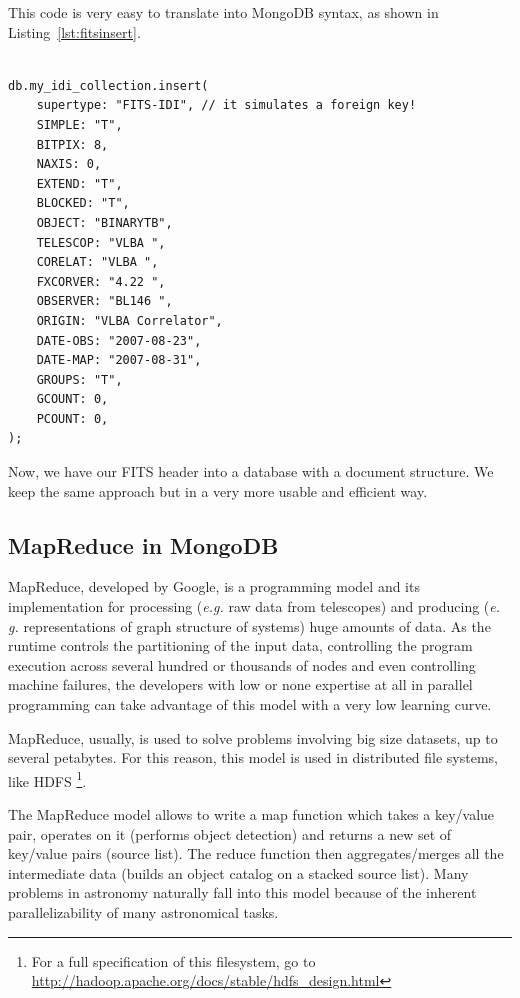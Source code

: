 This code is very easy to translate into MongoDB syntax, as shown in Listing~\ref{lst:fitsinsert}.

\begin{lstlisting}[float,label=lst:fitsinsert,caption=MongoDB BSON code for adding FITS metadata to the NoSQL database.]

db.my_idi_collection.insert(
    supertype: "FITS-IDI", // it simulates a foreign key!
    SIMPLE: "T",
    BITPIX: 8,
    NAXIS: 0,
    EXTEND: "T",
    BLOCKED: "T",
    OBJECT: "BINARYTB",
    TELESCOP: "VLBA ",
    CORELAT: "VLBA ",
    FXCORVER: "4.22 ",
    OBSERVER: "BL146 ",
    ORIGIN: "VLBA Correlator",
    DATE-OBS: "2007-08-23",
    DATE-MAP: "2007-08-31",
    GROUPS: "T",
    GCOUNT: 0,
    PCOUNT: 0,
);

\end{lstlisting}

Now, we have our FITS header into a database with a document structure. We keep the same approach but in a very more usable and efficient way.


\subsection{MapReduce in MongoDB} %
\label{sec:mapreduce_in_mongodb}

MapReduce, developed by Google, is a programming model and its implementation for processing (\textit{e.g.} raw data from telescopes) and producing (\textit{e. g.} representations of graph structure of systems) huge amounts of data. As the runtime controls the partitioning of the input data, controlling the program execution across several hundred or thousands of nodes and even controlling machine failures, the developers with low or none expertise at all in parallel programming can take advantage of this model with a very low learning curve.

MapReduce, usually, is used to solve problems involving big size datasets, up to several petabytes. For this reason, this model is used in distributed file systems, like HDFS \footnote{For a full specification of this filesystem, go to \url{http://hadoop.apache.org/docs/stable/hdfs_design.html}}.

The MapReduce model allows to write a map function which takes a key/value pair, operates on it (performs object detection) and returns a new set of key/value pairs (source list). The reduce function then aggregates/merges all the intermediate data (builds an object catalog on a stacked source list). Many problems in astronomy naturally fall into this model because of the inherent parallelizability of many astronomical tasks.

